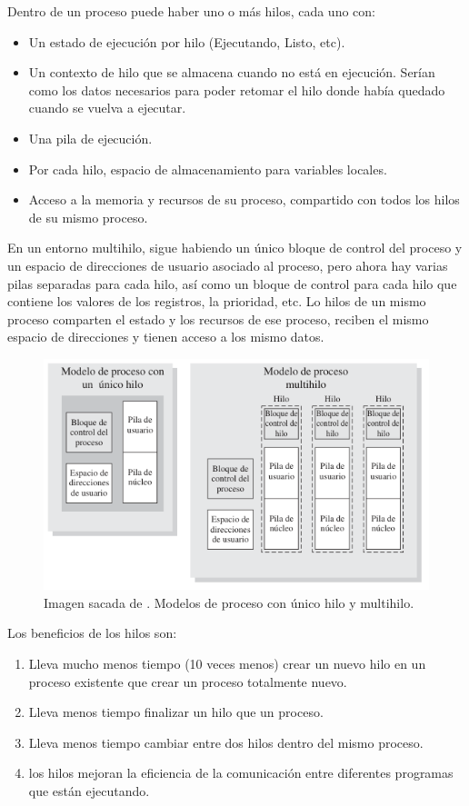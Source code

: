 \documentclass[12pt]{article}
\begin{document}
  Dentro de un proceso puede haber uno o más hilos, cada uno con:
  \begin{itemize}
    \item Un estado de ejecución por hilo (Ejecutando, Listo, etc).

    \item Un contexto de hilo que se almacena cuando no está en ejecución. Serían como los datos necesarios para poder retomar el hilo donde había quedado cuando se vuelva a ejecutar.

    \item Una pila de ejecución.

    \item Por cada hilo, espacio de almacenamiento para variables locales.

    \item Acceso a la memoria y recursos de su proceso, compartido con todos los hilos de su mismo proceso.
  \end{itemize}

  En un entorno multihilo, sigue habiendo un único bloque de control del proceso y un espacio de direcciones de usuario asociado al proceso, pero ahora hay varias pilas separadas para cada hilo, así como un bloque de control para cada hilo que contiene los valores de los registros, la prioridad, etc. Lo hilos de un mismo proceso comparten el estado y los recursos de ese proceso, reciben el mismo espacio de direcciones y tienen acceso a los mismo datos. 

  \begin{figure}[H]
    \centering
    \includegraphics[width=0.7\linewidth]{imagenes/mono-vs-multihilo.png}
    \caption{Imagen sacada de \parencite{sostallings}. Modelos de proceso con único hilo y multihilo.}
    \label{fig:mono-vs-multihilo}
  \end{figure}  

  Los beneficios de los hilos son:
  \begin{enumerate}[1.]
    \item Lleva mucho menos tiempo (10 veces menos) crear un nuevo hilo en un proceso existente que crear un proceso totalmente nuevo.

    \item Lleva menos tiempo finalizar un hilo que un proceso.

    \item Lleva menos tiempo cambiar entre dos hilos dentro del mismo proceso.

    \item los hilos mejoran la eficiencia de la comunicación entre diferentes programas que están ejecutando.
  \end{enumerate}
\end{document}
